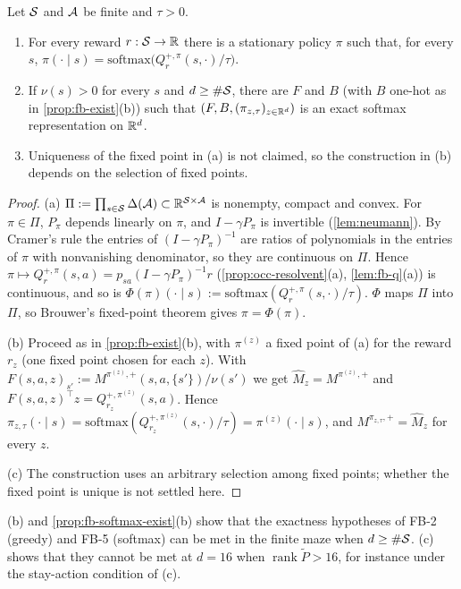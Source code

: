 \begin{proposition}\label{prop:fb-softmax-exist}
Let $\mathcal{S}$ and $\mathcal{A}$ be finite and $\tau>0$.
\begin{enumerate}[nosep,label=(\alph*)]
\item For every reward $r:\mathcal{S}\to\mathbb{R}$ there is a stationary policy $\pi$ such that, for every $s$,
  $\pi(\cdot\mid s)=\mathrm{softmax}\big(Q^{+,\pi}_r(s,\cdot)/\tau\big)$.
\item If $\nu(s)>0$ for every $s$ and $d\ge\#\mathcal{S}$, there are $F$ and $B$ (with $B$ one-hot as in \cref{prop:fb-exist}(b)) such that $(F,B,(\pi_{z,\tau})_{z\in\mathbb{R}^d})$ is an exact softmax representation on $\mathbb{R}^d$.
\item Uniqueness of the fixed point in (a) is not claimed, so the construction in (b) depends on the selection of fixed points.
\end{enumerate}
\end{proposition}
\begin{proof}
(a) $\Pi:=\prod_{s\in\mathcal{S}}\Delta(\mathcal{A})\subset\mathbb{R}^{\mathcal{S}\times\mathcal{A}}$ is nonempty, compact and convex.
For $\pi\in\Pi$, $P_\pi$ depends linearly on $\pi$, and $I-\gamma P_\pi$ is invertible (\cref{lem:neumann}).
By Cramer's rule the entries of $(I-\gamma P_\pi)^{-1}$ are ratios of polynomials in the entries of $\pi$ with nonvanishing denominator, so they are continuous on $\Pi$.
Hence $\pi\mapsto Q^{+,\pi}_r(s,a)=p_{sa}(I-\gamma P_\pi)^{-1}r$ (\cref{prop:occ-resolvent}(a), \cref{lem:fb-q}(a)) is continuous, and so is $\Phi(\pi)(\cdot\mid s):=\mathrm{softmax}(Q^{+,\pi}_r(s,\cdot)/\tau)$.
$\Phi$ maps $\Pi$ into $\Pi$, so Brouwer's fixed-point theorem gives $\pi=\Phi(\pi)$.

(b) Proceed as in \cref{prop:fb-exist}(b), with $\pi^{(z)}$ a fixed point of (a) for the reward $r_z$ (one fixed point chosen for each $z$).
With $F(s,a,z)_{s'}:=M^{\pi^{(z)},+}(s,a,\{s'\})/\nu(s')$ we get $\hat M_z=M^{\pi^{(z)},+}$ and $F(s,a,z)^\top z=Q^{+,\pi^{(z)}}_{r_z}(s,a)$.
Hence $\pi_{z,\tau}(\cdot\mid s)=\mathrm{softmax}(Q^{+,\pi^{(z)}}_{r_z}(s,\cdot)/\tau)=\pi^{(z)}(\cdot\mid s)$, and $M^{\pi_{z,\tau},+}=\hat M_z$ for every $z$.

(c) The construction uses an arbitrary selection among fixed points; whether the fixed point is unique is not settled here.
\end{proof}

(b) and \cref{prop:fb-softmax-exist}(b) show that the exactness hypotheses of FB-2 (greedy) and FB-5 (softmax) can be met in the finite maze when $d\ge\#\mathcal{S}$. (c) shows that they cannot be met at $d=16$ when $\operatorname{rank}\tilde P>16$, for instance under the stay-action condition of (c).

